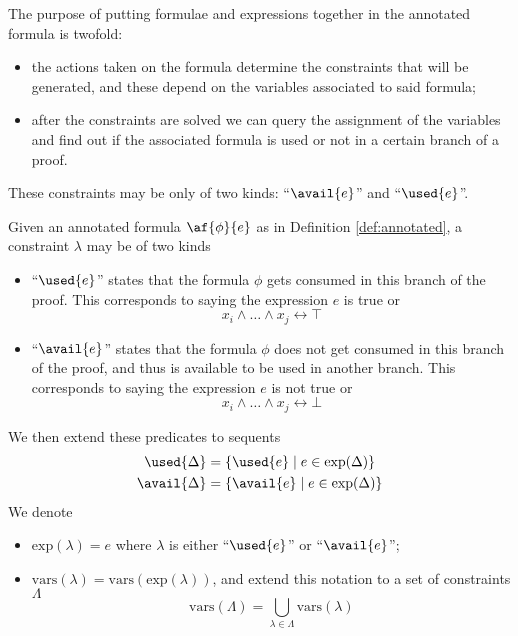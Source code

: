 The purpose of putting formulae and expressions together in the annotated formula is twofold:
\begin{itemize}
	\item the actions taken on the formula determine the constraints that will be generated, and these depend on the variables associated to said formula;
	\item after the constraints are solved we can query the assignment of the variables and find out if the associated formula is used or not in a certain branch of a proof.
\end{itemize}
These constraints may be only of two kinds: ``$\avail{e}$'' and ``$\used{e}$''.
\begin{define}[Constraints]
	\label{def:constraints}
	Given an annotated formula $\af{\phi}{e}$ as in Definition \ref{def:annotated}, a constraint $\lambda$ may be of two kinds
	\begin{itemize}
		\item ``$\used{e}$'' states that the formula $\phi$ gets consumed in this branch of the proof.
			This corresponds to saying the expression $e$ is true or
			$$ x_i \wedge \dots \wedge x_j \leftrightarrow \top $$
		\item ``$\avail{e}$'' states that the formula $\phi$ does not get consumed in this branch of the proof, and thus is available to be used in another branch.
			This corresponds to saying the expression $e$ is not true or
			$$ x_i \wedge \dots \wedge x_j \leftrightarrow \bot $$
	\end{itemize}
	We then extend these predicates to sequents
	\begin{align*}
		\used{\Delta} &= \{ \used{e} \mid e \in \mathrm{exp}(\Delta) \} \\
		\avail{\Delta} &= \{ \avail{e} \mid e \in \mathrm{exp}(\Delta) \}
	\end{align*}
	We denote
	\begin{itemize}
		\item $\mathrm{exp}(\lambda) = e$ where $\lambda$ is either ``$\used{e}$'' or ``$\avail{e}$'';
		\item $\mathrm{vars}(\lambda) = \mathrm{vars}(\mathrm{exp}(\lambda))$, and extend this notation to a set of constraints $\Lambda$
			$$ \mathrm{vars}(\Lambda) = \bigcup_{\lambda \in \Lambda} \mathrm{vars}(\lambda) $$
	\end{itemize}
\end{define}
